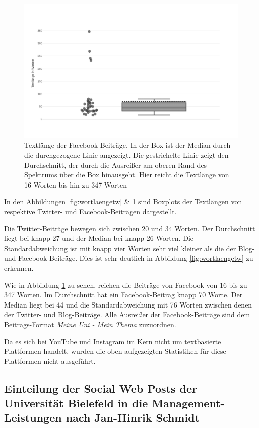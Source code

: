 \begin{figure}[h]
    \centering
    \includegraphics[width=\textwidth]{img/plots/fb.png}
    \caption{Textlänge der Facebook-Beiträge. In der Box ist der Median durch die durchgezogene Linie angezeigt. Die gestrichelte Linie zeigt den Durchschnitt, der durch die Ausreißer am oberen Rand des Spektrums über die Box hinausgeht. Hier reicht die Textlänge von 16 Worten bis hin zu 347 Worten}
    \label{fig:wortlaengefb}
\end{figure}

In den Abbildungen \ref{fig:wortlaengetw} \& \ref{fig:wortlaengefb} sind Boxplots der Textlängen von respektive Twitter- und Facebook-Beiträgen dargestellt.

Die Twitter-Beiträge bewegen sich zwischen 20 und 34 Worten. Der Durchschnitt liegt bei knapp 27 und der Median bei knapp 26 Worten. Die Standardabweichung ist mit knapp vier Worten sehr viel kleiner als die der Blog- und Facebook-Beiträge. Dies ist sehr deutlich in Abbildung \ref{fig:wortlaengetw} zu erkennen.

Wie in Abbildung \ref{fig:wortlaengefb} zu sehen, reichen die Beiträge von Facebook von 16 bis zu 347 Worten. Im Durchschnitt hat ein Facebook-Beitrag knapp 70 Worte. Der Median liegt bei 44 und die Standardabweichung mit 76 Worten zwischen denen der Twitter- und Blog-Beiträge. Alle Ausreißer der Facebook-Beiträge sind dem Beitrags-Format \textit{Meine Uni - Mein Thema} zuzuordnen.

Da es sich bei YouTube und Instagram im Kern nicht um textbasierte Plattformen handelt, wurden die oben aufgezeigten Statistiken für diese Plattformen nicht ausgeführt.


\subsection{Einteilung der Social Web Posts der Universität Bielefeld in die Management-Leistungen nach Jan-Hinrik Schmidt}
\label{sec:jhseinteilung}


